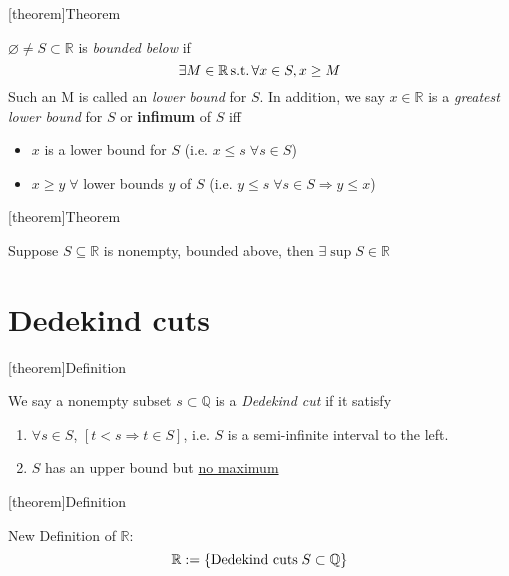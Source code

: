 \documentclass[12pt]{report}
\theoremstyle{definition}
\begin{document}
[theorem]{Theorem}
\begin{lower bound and inf}
    $\varnothing \neq S \subset \mathbb{R}$ is \emph{bounded below} if \[
        \exists M \in \mathbb{R} \,\textnormal{s.t.} \, \forall x \in S, x \ge M
    \]
    Such an M is called an \emph{lower bound} for $S$. 
    In addition, we say $x \in \mathbb{R}$ is a \emph{greatest lower bound} for $S$ or \textbf{infimum} of $S$ iff
    \begin{itemize}
        \item $x$ is a lower bound for $S$ (i.e. $x \le s \;\forall s \in S$)
        \item $x \ge y \;\forall$ lower bounds $y$ of $S$ (i.e. $y \le s \;\forall s \in S \Rightarrow y \le x$)
    \end{itemize}
\end{lower bound and inf}

[theorem]{Theorem}
\begin{Completeness axiom of real numbers}
    Suppose $S \subseteq \mathbb{R}$ is nonempty, bounded above, then $\exists \sup{S} \in \mathbb{R}$
\end{Completeness axiom of real numbers}

\section{Dedekind cuts}
[theorem]{Definition}
\begin{Dedekind cut}
    We say a nonempty subset $s \subset \mathbb{Q}$ is a \emph{Dedekind cut} if it satisfy
    \begin{enumerate}[label = (\roman*)]
        \item $\forall s \in S$, $[t < s \Rightarrow t \in S]$, i.e. $S$ is a semi-infinite interval to the left.
        \item $S$ has an upper bound but \underline{no maximum}
    \end{enumerate}
\end{Dedekind cut}

[theorem]{Definition}
\begin{Dedekind cut's version of real numbers}
    New Definition of $\mathbb{R}$:\[
    \mathbb{R} := \{ \textnormal{Dedekind cuts} \;S \subset \mathbb{Q}\}
\]
\end{Dedekind cut's version of real numbers}
\end{document}
